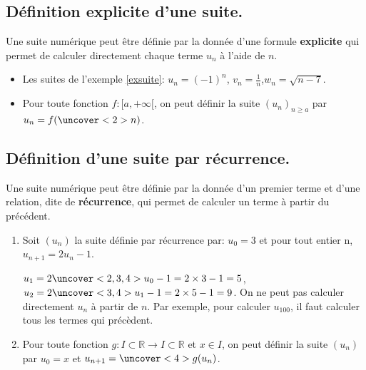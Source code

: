 \documentclass{beamer}
\begin{document}
  \subsection{Définition explicite d'une suite.} 
    
  \begin{frame}
  \begin{definition}
  Une suite numérique peut être définie par la donnée d'une formule 
  \textbf{explicite}
  qui permet de calculer directement chaque terme $u_n$ à l'aide de $n$.
  \end{definition}
  \end{frame}
  
  \begin{frame}
   \begin{example}
   \begin{itemize}
    \item Les suites de l'exemple \ref{exsuite}: $u_n=(-1)^n$, $v_n=\frac{1}{n}$,$w_n=\sqrt{n-7}$.
    \item Pour toute fonction $f:[a,+\infty[$, on peut définir la suite
   $(u_n)_{n \geq a}$ par $u_n=f(\uncover<2>{n})$. 
   \end{itemize}

  \end{example}
  \end{frame}
  
  \subsection{Définition d'une suite par récurrence.}
  
  \begin{frame}
   \begin{theorem}
      Une suite numérique peut être définie par la donnée d'un premier terme
      et d'une relation, dite de \textbf{récurrence}, qui permet de calculer 
      un terme à partir du précédent.
   \end{theorem}
  \end{frame}
  
  \begin{frame}
    \begin{example}
    \begin{enumerate}
    \item
    Soit $(u_n)$ la suite définie par récurrence par: $u_0=3$ et pour tout entier n, $u_{n+1}=2u_n-1$.

  $u_1=2\uncover<2,3,4> {u_0}-1=2 \times 3-1=5$, $u_2=2 \uncover<3,4>{u_1}-1=2 \times 5-1=9$. On ne peut pas calculer
  directement $u_n$ à partir de $n$. Par exemple, pour calculer $u_{100}$, il 
  faut calculer tous les termes qui précèdent.
  
  \item Pour toute fonction $g:I \subset \mathbb{R}
  \to I \subset \mathbb{R}$ et $x \in I$, on peut définir la suite $(u_n)$ par $u_0= x$ et 
  $u_{n+1}=\uncover<4>{g}(u_n)$.
  \end{enumerate}
  
   \end{example}
  \end{frame}
  
\end{document}
